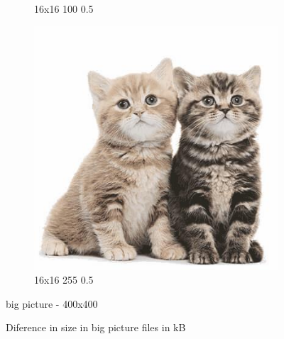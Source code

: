 \documentclass[12pt,a4paper]{article}
\begin{document}
\begin{figure}[H]
\begin{subfigure}{0.25\textwidth}
  \caption{16x16 100 0.5}
  \label{fig:6}
\end{subfigure}
\begin{subfigure}{0.25\textwidth}
  \includegraphics[width=\linewidth]{images/big/16-16-255-05}
  \caption{16x16 255 0.5}
  \label{fig:5}
\end{subfigure}\hfil %


\caption{big picture - 400x400}
\label{fig:images}
\end{figure}

\begin{figure}[H]
    \begin{bchart}[max=500]
            \smallskip
            \smallskip
            \smallskip
            \smallskip
            \smallskip
            \smallskip
            \smallskip
            \smallskip
            \smallskip
            \smallskip
            \smallskip
            \smallskip
    \end{bchart}
    \caption{Diference in size in big picture files in kB}
    \end{figure}
    
\end{document}
